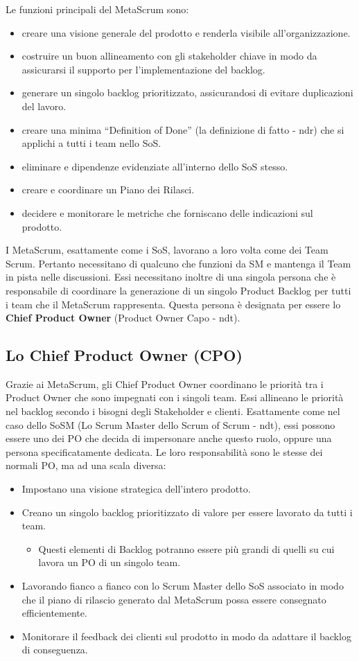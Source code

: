 \documentclass[12pt,a4paper,parskip=full]{scrartcl}
\begin{document}
Le funzioni principali del MetaScrum sono:
\begin{itemize}
\item creare una visione generale del prodotto e renderla visibile all'organizzazione.
\item costruire un buon allineamento con gli stakeholder chiave in modo da assicurarsi il supporto per l'implementazione del backlog.
\item generare un singolo backlog prioritizzato, assicurandosi di evitare duplicazioni del lavoro.
\item creare una minima ``Definition of Done'' (la definizione di fatto - ndr) che si applichi a tutti i team nello SoS.
\item eliminare e dipendenze evidenziate all'interno dello SoS stesso.
\item creare e coordinare un Piano dei Rilasci.
\item decidere e monitorare le metriche che forniscano delle indicazioni sul prodotto.
\end{itemize}
I MetaScrum, esattamente come i SoS, lavorano a loro volta come dei Team Scrum. Pertanto necessitano di qualcuno che funzioni da SM e mantenga il Team in pista nelle discussioni. Essi necessitano inoltre di una singola persona che è responsabile di coordinare la generazione di un singolo Product Backlog per tutti i team che il MetaScrum rappresenta. Questa persona è designata per essere lo \textbf{Chief Product Owner} (Product Owner Capo - ndt).

\subsection{Lo Chief Product Owner (CPO)}
Grazie ai MetaScrum, gli Chief Product Owner coordinano le priorità tra i Product Owner che sono impegnati con i singoli team. Essi allineano le priorità nel backlog secondo i bisogni degli Stakeholder e clienti. Esattamente come nel caso dello SoSM (Lo Scrum Master dello Scrum of Scrum - ndt), essi possono essere uno dei PO che decida di impersonare anche questo ruolo, oppure una persona specificatamente dedicata. Le loro responsabilità sono le stesse dei normali PO, ma ad una scala diversa: 
\begin{itemize}
\item Impostano una visione strategica dell'intero prodotto.
\item Creano un singolo backlog prioritizzato di valore per essere lavorato da tutti i team.
\begin{itemize}
\item Questi elementi di Backlog potranno essere più grandi di quelli su cui lavora un PO di un singolo team.
\end{itemize}
\item Lavorando fianco a fianco con lo Scrum Master dello SoS associato in modo che il piano di rilascio generato dal MetaScrum possa essere consegnato efficientemente.
\item Monitorare il feedback dei clienti sul prodotto in modo da adattare il backlog di conseguenza.
\end{itemize}
\end{document}
